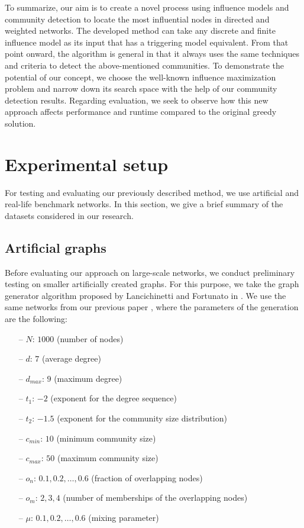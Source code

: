 \documentclass[pdflatex,sn-mathphys-ay]{sn-jnl}
\begin{document}
To summarize, our aim is to create a novel process using influence models and community detection to locate the most influential nodes in directed and weighted networks. The developed method can take any discrete and finite influence model as its input that has a triggering model equivalent. From that point onward, the algorithm is general in that it always uses the same techniques and criteria to detect the above-mentioned communities. To demonstrate the potential of our concept, we choose the well-known influence maximization problem and narrow down its search space with the help of our community detection results. Regarding evaluation, we seek to observe how this new approach affects performance and runtime compared to the original greedy solution.


\section{Experimental setup}\label{sec_setup}

For testing and evaluating our previously described method, we use artificial and real-life benchmark networks. In this section, we give a brief summary of the datasets considered in our research.


\subsection{Artificial graphs}\label{subsec_artificial}

Before evaluating our approach on large-scale networks, we conduct preliminary testing on smaller artificially created graphs. For this purpose, we take the graph generator algorithm proposed by Lancichinetti and Fortunato in \citep{fortunato}. We use the same networks from our previous paper \citep{evaluating}, where the parameters of the generation are the following:

\begin{itemize}
    \item[--] $N$: $1000$ (number of nodes)
    \item[--] $d$: $7$ (average degree)
    \item[--] $d_{max}$: $9$ (maximum degree)
    \item[--] $t_1$: $-2$ (exponent for the degree sequence)
    \item[--] $t_2$: $-1.5$ (exponent for the community size distribution)
    \item[--] $c_{min}$: $10$ (minimum community size)
    \item[--] $c_{max}$: $50$ (maximum community size)
    \item[--] $o_n$: $0.1, 0.2, \dots, 0.6$ (fraction of overlapping nodes)
    \item[--] $o_m$: $2, 3, 4$ (number of memberships of the overlapping nodes)
    \item[--] $\mu$: $0.1, 0.2, \dots, 0.6$ (mixing parameter)
\end{itemize}
\end{document}
